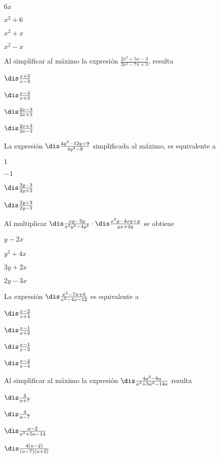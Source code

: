 \documentclass[12pt, fleqn]{article}
\begin{document}
\benu
\item[] \opc $6x$
\item[] \opc $x^2+6$
\item[] \opc $x^2+x$
\item[] \opc $x^2-x$
\eenu
\vs

\item Al simplificar al máximo la expresión $\displaystyle\frac{2x^2+5x-3}{2x^2-7x+3}$, resulta
\vp

\benu
\item[] \opc $\dis\frac{x+3}{x-3}$ \vp
\item[] \opc $\dis\frac{x-3}{x+3}$ \vp
\item[] \opc $\dis\frac{2x-3}{2x+3}$ \vp
\item[] \opc $\dis\frac{2x+3}{2x-3}$
\eenu
\vs

\item La expresión $\dis\frac{4y^2-12y+9}{4y^2-9}$ simplificada al máximo, es equivalente a
\vp

\benu
\item[] \opc $1$
\item[] \opc $-1$
\item[] \opc $\dis\frac{2y-3}{2y+3}$
\item[] \opc $\dis\frac{2y+3}{2y-3}$
\eenu
\vp

\item Al multiplicar $\dis\frac{xy-2y}{x^2y^2-4y^2}\cdot\dis\frac{x^2y-4xy+y}{yx+2y}$ se obtiene
\vp

\benu
\item[] \opc $y-2x$
\item[] \opc $y^2+4x$
\item[] \opc $3y+2x$
\item[] \opc $2y-3x$
\eenu
\vs

\pagebreak

\item La expresión $\dis\frac{x^2-7x+6}{x^2-4x-12}$ es equivalente a
\vp

\benu
\item[] \opc $\dis\frac{x-2}{x+4}$ \vp
\item[] \opc $\dis\frac{x-1}{x+2}$ \vp
\item[] \opc $\dis\frac{x-1}{x-2}$ \vp
\item[] \opc $\dis\frac{x-2}{x-4}$
\eenu
\vs

\item Al simplificar al máximo la expresión $\dis\frac{4a^2-8a}{a^3+5a^2-14a}$ resulta
\vp

\benu
\item[] \opc $\dis\frac{4}{a+7}$ \vp
\item[] \opc $\dis\frac{4}{a-7}$ \vp
\item[] \opc $\dis\frac{a-2}{a^2+5a-14}$ \vp
\item[] \opc $\dis\frac{4(a-2)}{(a-7)(a+2)}$
\eenu
\vs
\end{document}
